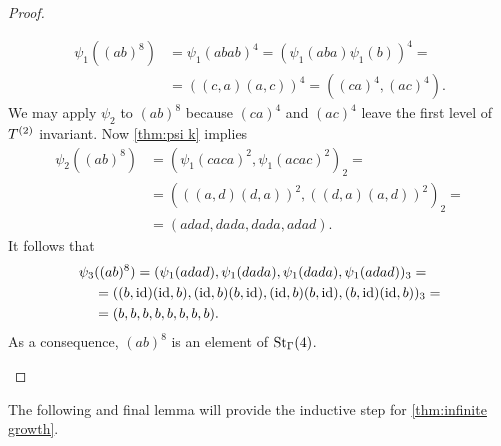 \begin{proof}
\begin{plist}
\begin{align*}
\psi_1((ab)^8)&=\psi_1(abab)^4=(\psi_1(aba)\psi_1(b))^4=\\
						&=((c,a)(a,c))^4=((ca)^4,(ac)^4).
\end{align*}
We may apply $\psi_2$ to $(ab)^8$ because $(ca)^4$ and $(ac)^4$ leave the first level of $\T$ invariant. Now \cref{thm:psi k} implies
\begin{align*}
\psi_2((ab)^8)	&=\left(\psi_1(caca)^2,\psi_1(acac)^2\right)_2=\\
				&=\left(((a,d)(d,a))^2,((d,a)(a,d))^2\right)_2=\\
				&=(adad,dada,dada,adad).
\end{align*}
It follows that 
\begin{align*}
\psi_3	&((ab)^8)=(\psi_1(adad),\psi_1(dada),\psi_1(dada),\psi_1(adad))_3=\\
			&=((b,\id)(\id,b),(\id,b)(b,\id),(\id,b)(b,\id),(b,\id)(\id,b))_3=\\
			&=(b,b,b,b,b,b,b,b).
\end{align*}
As a consequence, $(ab)^8$ is an element of $\St[\Gamma]{4}$.
\end{plist}
\end{proof}

The following and final lemma will provide the inductive step for \cref{thm:infinite growth}.

